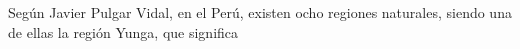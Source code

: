 \item{Según Javier Pulgar Vidal, en el Perú, existen ocho regiones naturales, siendo una de ellas la región Yunga, que significa
\begin{tasks}
\end{tasks}}

